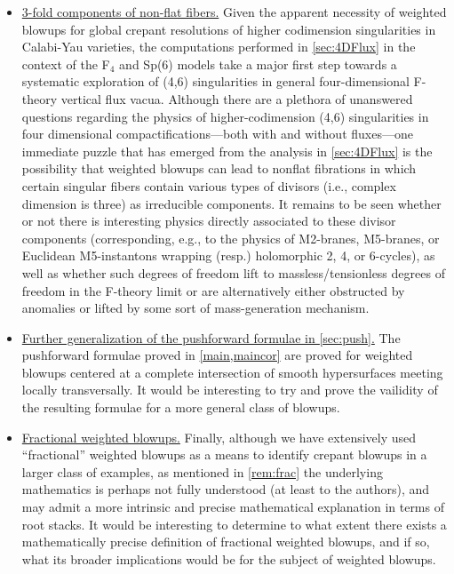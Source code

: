 \documentclass[11pt,oneside,english]{article}
\numberwithin{equation}{section}
\theoremstyle{definition}
\begin{document}
\begin{itemize}
\item{} \underline{3-fold components of non-flat fibers.} Given the apparent necessity of weighted blowups for global crepant resolutions of higher codimension singularities in Calabi-Yau varieties, the computations performed in \cref{sec:4DFlux} in the context of the F$_4$ and Sp(6) models take a major first step towards a systematic exploration of (4,6) singularities in general four-dimensional F-theory vertical flux vacua. Although there are a plethora of unanswered questions regarding the physics of higher-codimension (4,6) singularities in four dimensional compactifications---both with and without fluxes---one immediate puzzle that has emerged from the analysis in \cref{sec:4DFlux} is the possibility that weighted blowups can lead to nonflat fibrations in which certain singular fibers contain various types of divisors (i.e., complex dimension is three) as irreducible components. It remains to be seen whether or not there is interesting physics directly associated to these divisor components (corresponding, e.g., to the physics of M2-branes, M5-branes, or Euclidean M5-instantons wrapping (resp.) holomorphic 2, 4, or 6-cycles), as well as whether such degrees of freedom lift to massless/tensionless degrees of freedom in the F-theory limit or are alternatively either obstructed by anomalies or lifted by some sort of mass-generation mechanism. 

\item{} \underline{Further generalization of the pushforward formulae in \cref{sec:push}.} The pushforward formulae proved in \cref{main,maincor} are proved for weighted blowups centered at a complete intersection of smooth hypersurfaces meeting locally transversally. It would be interesting to try and prove the vailidity of the resulting formulae for a more general class of blowups. 

\item{} \underline{Fractional weighted blowups.} Finally, although we have extensively used ``fractional'' weighted blowups as a means to identify crepant blowups in a larger class of examples, as mentioned in \cref{rem:frac} the underlying mathematics is perhaps not fully understood (at least to the authors), and may admit a more intrinsic and precise mathematical explanation in terms of root stacks. It would be interesting to determine to what extent there exists a mathematically precise definition of fractional weighted blowups, and if so, what its broader implications would be for the subject of weighted blowups. 

\end{itemize}
\end{document}
